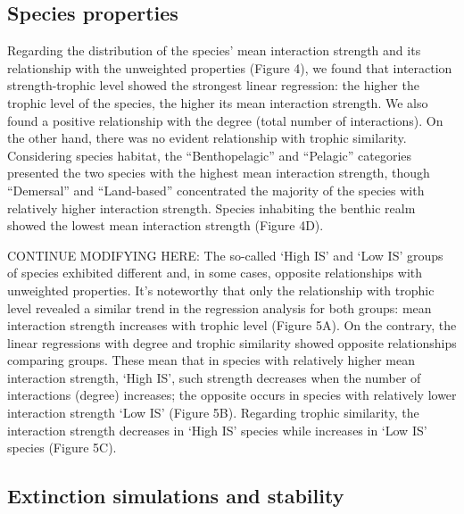 \documentclass[gc, manuscript]{copernicus}
\begin{document}
\subsection{Species properties}

Regarding the distribution of the species' mean interaction strength and
its relationship with the unweighted properties (Figure 4), we found
that interaction strength-trophic level showed the strongest linear
regression: the higher the trophic level of the species, the higher its
mean interaction strength. We also found a positive relationship with
the degree (total number of interactions). On the other hand, there was
no evident relationship with trophic similarity. Considering species
habitat, the ``Benthopelagic'' and ``Pelagic'' categories presented the
two species with the highest mean interaction strength, though
``Demersal'' and ``Land-based'' concentrated the majority of the species
with relatively higher interaction strength. Species inhabiting the
benthic realm showed the lowest mean interaction strength (Figure 4D).

CONTINUE MODIFYING HERE: The so-called `High IS' and `Low IS' groups of
species exhibited different and, in some cases, opposite relationships
with unweighted properties. It's noteworthy that only the relationship
with trophic level revealed a similar trend in the regression analysis
for both groups: mean interaction strength increases with trophic level
(Figure 5A). On the contrary, the linear regressions with degree and
trophic similarity showed opposite relationships comparing groups. These
mean that in species with relatively higher mean interaction strength,
`High IS', such strength decreases when the number of interactions
(degree) increases; the opposite occurs in species with relatively lower
interaction strength `Low IS' (Figure 5B). Regarding trophic similarity,
the interaction strength decreases in `High IS' species while increases
in `Low IS' species (Figure 5C).

\subsection{Extinction simulations and stability}
\end{document}
